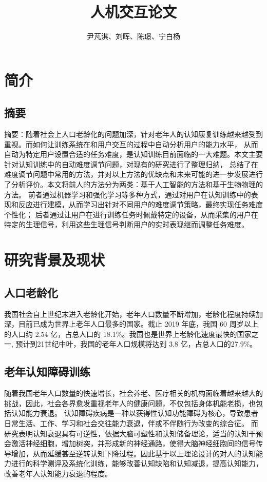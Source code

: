 \documentclass{article}
\author{尹芃淇、刘晖、陈璟、宁白杨}
\title{人机交互论文}
\begin{document}
    \maketitle
    \section{简介}
    \subsection{摘要}
    摘要：随着社会上人口老龄化的问题加深，针对老年人的认知康复训练越来越受到重视。而如何让训练系统在和用户交互的过程中自动分析用户的能力水平，
    从而自动为特定用户设置合适的任务难度，是认知训练目前面临的一大难题。本文主要针对认知训练中的自动难度调节问题，对现有的研究进行了整理归纳，
    总结了在难度调节问题中常用的方法，并对以上方法的优缺点和未来可能的进一步发展进行了分析评价。本文将前人的方法分为两类：基于人工智能的方法和基于生物物理的方法。
    前者通过机器学习和强化学习等多种方式，通过对用户在认知训练中的表现和反应进行建模，从而学习出针对不同用户的难度调节策略，最终实现任务难度个性化；
    后者通过让用户在进行训练任务时佩戴特定的设备，从而采集的用户在特定的生理信号，利用这些生理信号判断用户的实时表现继而调整任务难度。
    \section{研究背景及现状}
        \subsection{人口老龄化}
        我国社会自上世纪末进入老龄化开始，老年人口数量不断增加，老龄化程度持续加深，目前已成为世界上老年人口最多的国家。截止 2019 年底，我国 60 周岁以上的人口约 2.54 亿，占总人口的 18.1\%。我国也是世界上老龄化速度最快的国家之一,
        预计到21世纪中叶，我国的老年人口规模将达到 3.8 亿，占总人口的27.9\%。
        
        \subsection{老年认知障碍训练}

        随着我国老年人口数量的快速增长，社会养老、医疗相关的机构面临着越来越大的挑战，因此，社会各界愈发重视老年人的健康问题，不仅包括身体机能老损，也包括认知能力衰退。
        认知障碍疾病是一种以获得性认知功能障碍为核心，导致患者日常生活、工作、学习和社会交往能力衰退，伴或不伴随行为改变的综合征。
        而研究表明认知衰退具有可逆性，依据大脑可塑性和认知储备理论\cite{ref1}，适当的认知干预会激活神经细胞，增加树突，并形成新的神经通路，使得大脑神经细胞间的信号传导增加\cite{ref2}，从而延缓甚至逆转认知下降过程。因此基于以上理论设计的对人的认知能力进行的科学测评及系统化训练，能够改善认知缺陷和认知减退，提高认知能力\cite{ref3, ref4}，改善老年人认知能力衰退的程度。
\end{document}

